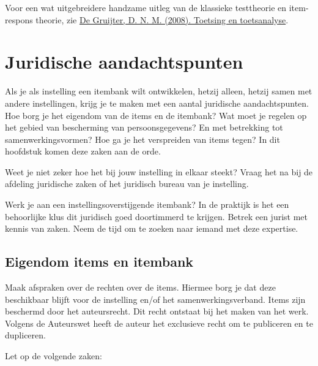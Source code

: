 \documentclass[
]{book}
\begin{document}
Voor een wat uitgebreidere handzame uitleg van de klassieke testtheorie en item-respons theorie, zie \href{https://www.universiteitleiden.nl/binaries/content/assets/iclon/ho/toetsing-en-toetsanalyse.pdf}{De Gruijter, D. N. M. (2008). Toetsing en toetsanalyse}.

\hypertarget{juridische-aandachtspunten-1}{%
\section{Juridische aandachtspunten}\label{juridische-aandachtspunten-1}}

Als je als instelling een itembank wilt ontwikkelen, hetzij alleen, hetzij samen met andere instellingen, krijg je te maken met een aantal juridische aandachtspunten. Hoe borg je het eigendom van de items en de itembank? Wat moet je regelen op het gebied van bescherming van persoonsgegevens? En met betrekking tot
samenwerkingsvormen? Hoe ga je het verspreiden van items tegen? In dit hoofdstuk komen deze zaken aan de orde.

Weet je niet zeker hoe het bij jouw instelling in elkaar steekt? Vraag het na bij de afdeling juridische zaken of het juridisch bureau van je instelling.

Werk je aan een instellingsoverstijgende itembank? In de praktijk is het een behoorlijke klus dit juridisch goed doortimmerd te krijgen. Betrek een jurist met kennis van zaken. Neem de tijd om te zoeken naar iemand met deze expertise.

\hypertarget{eigendom-items-en-itembank}{%
\subsection{Eigendom items en itembank}\label{eigendom-items-en-itembank}}

Maak afspraken over de rechten over de items. Hiermee borg je dat deze beschikbaar blijft voor de instelling en/of het samenwerkingsverband. Items zijn beschermd
door het auteursrecht. Dit recht ontstaat bij het maken van het werk. Volgens de Auteurswet heeft de auteur het exclusieve recht om te publiceren en te dupliceren.

Let op de volgende zaken:
\end{document}
